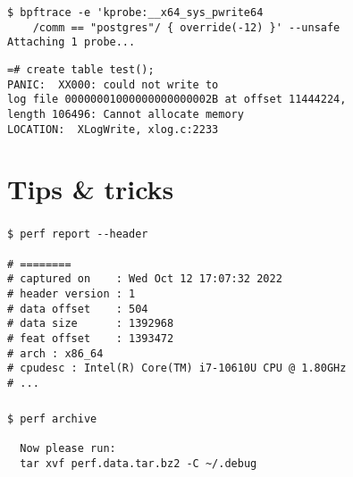 \documentclass[usenames,dvipsnames, 18pt, compress, aspectratio=169]{beamer}
\begin{document}
\begin{frame}[fragile]{}
    \frametitle{}
    \begin{center}
        \begin{verbatim}
$ bpftrace -e 'kprobe:__x64_sys_pwrite64
    /comm == "postgres"/ { override(-12) }' --unsafe
Attaching 1 probe...
        \end{verbatim}

        \begin{verbatim}
=# create table test();
PANIC:  XX000: could not write to
log file 00000001000000000000002B at offset 11444224,
length 106496: Cannot allocate memory
LOCATION:  XLogWrite, xlog.c:2233
        \end{verbatim}
    \end{center}
\end{frame}

\section{Tips \& tricks}

\begin{frame}[fragile]{}
    \frametitle{}
    \begin{center}
        \begin{verbatim}
$ perf report --header

# ========
# captured on    : Wed Oct 12 17:07:32 2022
# header version : 1
# data offset    : 504
# data size      : 1392968
# feat offset    : 1393472
# arch : x86_64
# cpudesc : Intel(R) Core(TM) i7-10610U CPU @ 1.80GHz
# ...
        \end{verbatim}
    \end{center}
\end{frame}

\begin{frame}[fragile]{}
    \frametitle{}
    \begin{center}
        \begin{verbatim}
$ perf archive

  Now please run:
  tar xvf perf.data.tar.bz2 -C ~/.debug
        \end{verbatim}
    \end{center}
\end{frame}
\end{document}
